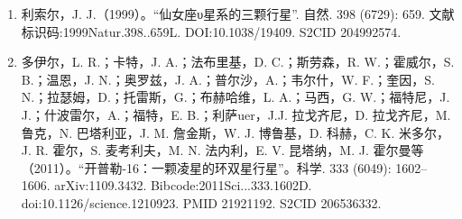 \begin{enumerate}
\item 利索尔，J. J.（1999）。“仙女座υ星系的三颗行星”. 自然. 398 (6729): 659. 文献标识码:1999Natur.398..659L. DOI:10.1038/19409. S2CID 204992574.
\item 多伊尔，L. R.；卡特，J. A.；法布里基，D. C.；斯劳森，R. W.；霍威尔，S. B.；温恩，J. N.；奥罗兹，J. A.；普尔沙，A.；韦尔什，W. F.；奎因，S. N.；拉瑟姆，D.；托雷斯，G.；布赫哈维，L. A.；马西，G. W.；福特尼，J. J.；什波雷尔，A.；福特，E. B.；利萨uer，J.J. 拉戈齐尼，D. 拉戈齐尼，M. 鲁克，N. 巴塔利亚，J. M. 詹金斯，W. J. 博鲁基，D. 科赫，C. K. 米多尔，J. R. 霍尔，S. 麦考利夫，M. N. 法内利，E. V. 昆塔纳，M. J. 霍尔曼等（2011）。“开普勒-16：一颗凌星的环双星行星”。科学. 333 (6049): 1602–1606. arXiv:1109.3432. Bibcode:2011Sci...333.1602D. doi:10.1126/science.1210923. PMID 21921192. S2CID 206536332.
 \end{enumerate}
